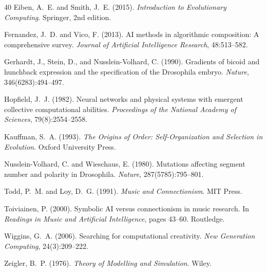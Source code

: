 \documentclass[11pt,a4paper]{article}
\begin{document}
\begin{thebibliography}{40}
Eiben, A.~E. and Smith, J.~E. (2015).
\newblock \emph{Introduction to Evolutionary Computing}.
\newblock Springer, 2nd edition.

Fernandez, J.~D. and Vico, F. (2013).
\newblock AI methods in algorithmic composition: A comprehensive survey.
\newblock \emph{Journal of Artificial Intelligence Research}, 48:513--582.

Gerhardt, J., Stein, D., and Nusslein-Volhard, C. (1990).
\newblock Gradients of bicoid and hunchback expression and the specification of the Drosophila embryo.
\newblock \emph{Nature}, 346(6283):494--497.

Hopfield, J.~J. (1982).
\newblock Neural networks and physical systems with emergent collective computational abilities.
\newblock \emph{Proceedings of the National Academy of Sciences}, 79(8):2554--2558.

Kauffman, S.~A. (1993).
\newblock \emph{The Origins of Order: Self-Organization and Selection in Evolution}.
\newblock Oxford University Press.

Nusslein-Volhard, C. and Wieschaus, E. (1980).
\newblock Mutations affecting segment number and polarity in Drosophila.
\newblock \emph{Nature}, 287(5785):795--801.

Todd, P.~M. and Loy, D.~G. (1991).
\newblock \emph{Music and Connectionism}.
\newblock MIT Press.

Toiviainen, P. (2000).
\newblock Symbolic AI versus connectionism in music research.
\newblock In \emph{Readings in Music and Artificial Intelligence}, pages 43--60. Routledge.

Wiggins, G.~A. (2006).
\newblock Searching for computational creativity.
\newblock \emph{New Generation Computing}, 24(3):209--222.

Zeigler, B.~P. (1976).
\newblock \emph{Theory of Modelling and Simulation}.
\newblock Wiley.

\end{thebibliography}
\end{document}
